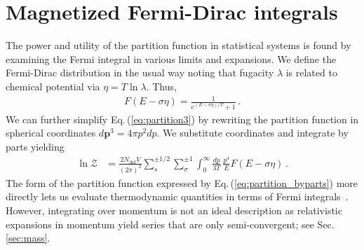 \documentclass[epjST]{svjour}
\newcommand{\req}[1]{Eq.\,(\ref{#1})}
\newcommand{\rsec}[1]{Sec.\,{\ref{#1}}}
\numberwithin{equation}{section}
\begin{document}
\section{Magnetized Fermi-Dirac integrals}
\label{sec:fermi_integrals}
The power and utility of the partition function in statistical systems is found by examining the Fermi integral in various limits and expansions. We define the Fermi-Dirac distribution in the usual way noting that fugacity \(\lambda\) is related to chemical potential via \(\eta = T\ln\lambda\). Thus,
\begin{align}
    F\left(E - \sigma\eta\right) = \frac{1}{e^{(E - \sigma\eta)/T} + 1}\,.
\end{align}
We can further simplify \req{eq:partition3} by rewriting the partition function in spherical coordinates \(d\mathbf{p}^{3}=4\pi p^{2}dp\). We substitute coordinates and integrate by parts yielding
\begin{align}
    \label{eq:partition_byparts}
    \ln\mathcal{Z} &= \frac{2 N_\mathrm{dof}V}{(2\pi)^{2}} \sum_{s}^{\pm1/2}\sum_{\sigma}^{\pm1}\int_{0}^{\infty} \frac{dp}{3T} \, \frac{p^4}{E}F\left(E - \sigma\eta\right)\,.
\end{align}
The form of the partition function expressed by \req{eq:partition_byparts} more directly lets us evaluate thermodynamic quantities in terms of Fermi integrals~\cite{Elze:1980er}. However, integrating over momentum is not an ideal description as relativistic expansions in momentum yield series that are only semi-convergent; see \rsec{sec:mass}.

\end{document}
